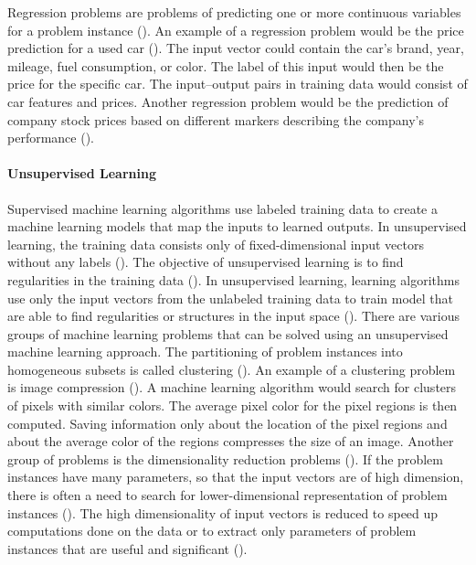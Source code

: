 \documentclass{BachelorBUI}
\begin{document}
                Regression problems are problems of predicting one or more continuous variables for a problem instance (\cite{Bishop:2006}). An example of a regression problem would be the price prediction for a used car (\cite{Alpaydin:2014}). The input vector could contain the car's brand, year, mileage, fuel consumption, or color. The label of this input would then be the price for the specific car. The input--output pairs in training data would consist of car features and prices. Another regression problem would be the prediction of company stock prices based on different markers describing the company's performance (\cite{Mohri:2018}).

            \paragraph{Unsupervised Learning}

                Supervised machine learning algorithms use labeled training data to create a machine learning models that map the inputs  to learned outputs. In unsupervised learning, the training data consists only of fixed-dimensional input vectors without any labels (\cite{Bishop:2006}). The objective of unsupervised learning is to find regularities in the training data (\cite{Alpaydin:2014}). In unsupervised learning, learning algorithms use only the input vectors from the unlabeled training data to train model that are able to find regularities or structures in the input space (\cite{Alpaydin:2014}). There are various groups of machine learning problems that can be solved using an unsupervised machine learning approach. The partitioning of problem instances into homogeneous subsets is called clustering (\cite{Mohri:2018}). An example of a clustering problem is image compression (\cite{Alpaydin:2014}). A machine learning algorithm would search for clusters of pixels with similar colors. The average pixel color for the pixel regions is then computed. Saving information only about the location of the pixel regions and about the average color of the regions compresses the size of an image. Another group of problems is the dimensionality reduction problems (\cite{Mohri:2018}). If the problem instances have many parameters, so that the input vectors are of high dimension, there is often a need to search for lower-dimensional representation of problem instances (\cite{Mohri:2018}). The high dimensionality of input vectors is reduced to speed up computations done on the data or to extract only parameters of problem instances that are useful and significant (\cite{Mohri:2018}).
\end{document}
